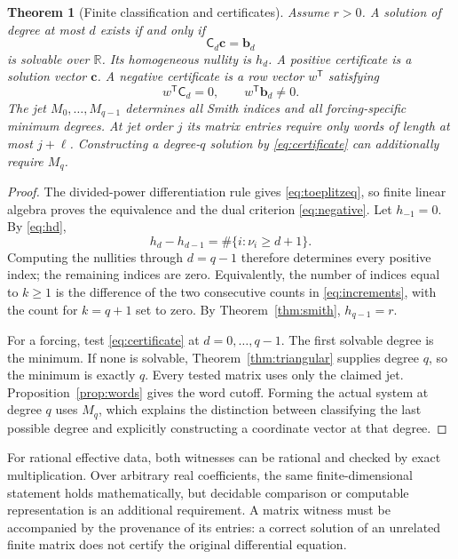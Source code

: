 \documentclass[11pt,a4paper]{article}
\numberwithin{equation}{section}
\newtheorem{theorem}{Theorem}[section]
\theoremstyle{definition}
\theoremstyle{remark}\newtheorem{remark}[theorem]{Remark}
\newcommand{\R}{\mathbb R}\newcommand{\C}{\mathbb C}
\begin{document}
\begin{theorem}[Finite classification and certificates]
\label{thm:jet}
Assume $r>0$. A solution of degree at most $d$ exists if and only if
\begin{equation}
 \mathsf C_d\mathbf c=\mathbf b_d
 \label{eq:certificate}
\end{equation}
is solvable over $\R$. Its homogeneous nullity is $h_d$. A positive certificate is a solution vector $\mathbf c$. A negative certificate is a row vector $w^{\mathsf T}$ satisfying
\begin{equation}
 w^{\mathsf T}\mathsf C_d=0,
 \qquad w^{\mathsf T}\mathbf b_d\ne0.
 \label{eq:negative}
\end{equation}
The jet $M_0,\ldots,M_{q-1}$ determines all Smith indices and all forcing-specific minimum degrees. At jet order $j$ its matrix entries require only words of length at most $j+\ell$. Constructing a degree-$q$ solution by \eqref{eq:certificate} can additionally require $M_q$.
\end{theorem}
\begin{proof}
The divided-power differentiation rule gives \eqref{eq:toeplitzeq}, so finite linear algebra proves the equivalence and the dual criterion \eqref{eq:negative}. Let $h_{-1}=0$. By \eqref{eq:hd},
\begin{equation}
 h_d-h_{d-1}=\#\{i:\nu_i\ge d+1\}.
 \label{eq:increments}
\end{equation}
Computing the nullities through $d=q-1$ therefore determines every positive index; the remaining indices are zero. Equivalently, the number of indices equal to $k\ge1$ is the difference of the two consecutive counts in \eqref{eq:increments}, with the count for $k=q+1$ set to zero. By Theorem~\ref{thm:smith}, $h_{q-1}=r$.

For a forcing, test \eqref{eq:certificate} at $d=0,\ldots,q-1$. The first solvable degree is the minimum. If none is solvable, Theorem~\ref{thm:triangular} supplies degree $q$, so the minimum is exactly $q$. Every tested matrix uses only the claimed jet. Proposition~\ref{prop:words} gives the word cutoff. Forming the actual system at degree $q$ uses $M_q$, which explains the distinction between classifying the last possible degree and explicitly constructing a coordinate vector at that degree.
\end{proof}

For rational effective data, both witnesses can be rational and checked by exact multiplication. Over arbitrary real coefficients, the same finite-dimensional statement holds mathematically, but decidable comparison or computable representation is an additional requirement. A matrix witness must be accompanied by the provenance of its entries: a correct solution of an unrelated finite matrix does not certify the original differential equation.
\end{document}
